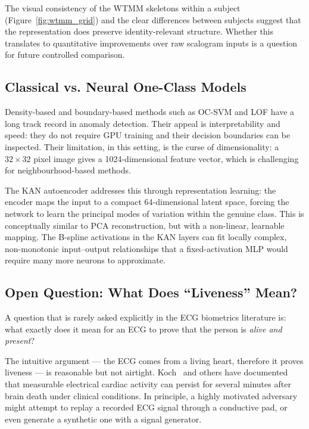 \documentclass[12pt, a4paper]{article}
\begin{document}
The visual consistency of the WTMM skeletons within a subject
(Figure~\ref{fig:wtmm_grid}) and the clear differences between subjects
suggest that the representation does preserve identity-relevant structure.
Whether this translates to quantitative improvements over raw scalogram
inputs is a question for future controlled comparison.

\subsection{Classical vs. Neural One-Class Models}

Density-based and boundary-based methods such as OC-SVM and LOF have
a long track record in anomaly detection. Their appeal is
interpretability and speed: they do not require GPU training and their
decision boundaries can be inspected.
Their limitation, in this setting, is the curse of dimensionality:
a $32 \times 32$ pixel image gives a 1024-dimensional feature vector,
which is challenging for neighbourhood-based methods.

The KAN autoencoder addresses this through representation learning:
the encoder maps the input to a compact 64-dimensional latent space,
forcing the network to learn the principal modes of variation within the
genuine class. This is conceptually similar to PCA reconstruction, but
with a non-linear, learnable mapping. The B-spline activations in the
KAN layers can fit locally complex, non-monotonic input--output
relationships that a fixed-activation MLP would require many more
neurons to approximate.

\subsection{Open Question: What Does ``Liveness'' Mean?}

A question that is rarely asked explicitly in the ECG biometrics
literature is: what exactly does it mean for an ECG to prove that the
person is \textit{alive and present}?

The intuitive argument --- the ECG comes from a living heart, therefore
it proves liveness --- is reasonable but not airtight.
Koch~\cite{koch2023} and others have documented that measurable electrical
cardiac activity can persist for several minutes after brain death under
clinical conditions.
In principle, a highly motivated adversary might attempt to replay
a recorded ECG signal through a conductive pad, or even generate a
synthetic one with a signal generator.
\end{document}
